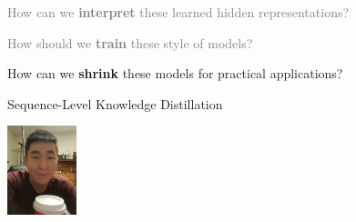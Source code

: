 \documentclass{beamer}
\let\tempone\itemize
\let\temptwo\enditemize
\renewenvironment{itemize}{\tempone\addtolength{\itemsep}{0.5\baselineskip}}{\temptwo}
\newcommand{\air}{\vspace{0.25cm}}
\newcommand{\Cite}[1]{{\footnotesize \citep{#1}}}
\begin{document}



\begin{frame}
  \centerline{}
  \air 
  \air

  \begin{itemize}
  \item \textcolor{gray}{How can we \textbf{interpret} these learned hidden representations? \Cite{Strobelt2016}}
    \air 
  \item  \textcolor{gray}{ How should we \textbf{train} these style of models? \Cite{Wiseman2016a}}
    \air 
  \item How can we \textbf{shrink} these models for practical applications?

    \air 
    \begin{center}
      \alert{Sequence-Level Knowledge Distillation }

      \Cite{Kim2016a} 

      \includegraphics[width=2cm]{yoon}
    \end{center}

  \end{itemize}
\end{frame}




\end{document}
